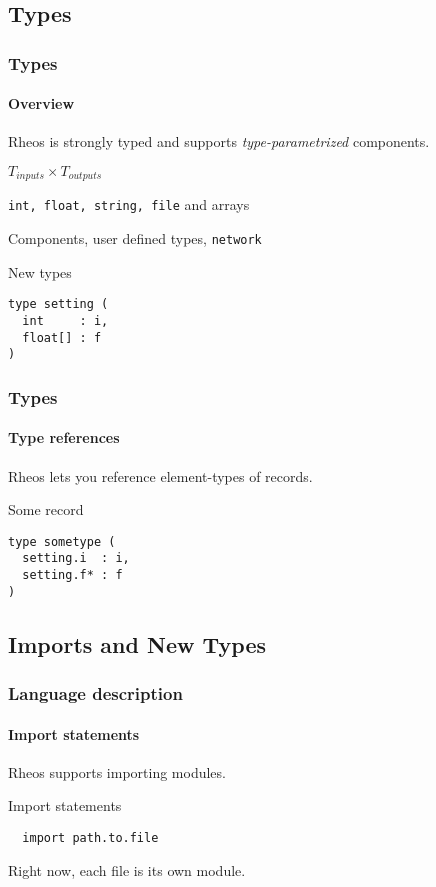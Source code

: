 \subsection*{Types}
\begin{frame}[fragile]
\frametitle{Types}
\framesubtitle{Overview}

Rheos is strongly typed and supports \emph{type-parametrized}
components.

\begin{description}
\pause
\item [Components:] $T_{inputs} \times T_{outputs}$
\pause
\item [Primitive types:] \verb|int, float, string, file| and arrays
\pause
\item [Record types:] Components, user defined types, \verb|network|
\end{description}

\pause
\begin{block}{New types}
\begin{verbatim}
type setting (
  int     : i,
  float[] : f
)
\end{verbatim}
\end{block}

\end{frame}


\begin{frame}[fragile]
\frametitle{Types}
\framesubtitle{Type references}

Rheos lets you reference element-types of records.

\pause
\begin{block}{Some record}
\begin{verbatim}
type sometype (
  setting.i  : i,
  setting.f* : f
)
\end{verbatim}
\end{block}

\end{frame}


\subsection*{Imports and New Types}
\begin{frame}[fragile]
\frametitle{Language description}
\framesubtitle{Import statements}

Rheos supports importing modules.

\pause
\begin{block}{Import statements}
\begin{verbatim}
  import path.to.file
\end{verbatim}
\end{block}

\pause
Right now, each file is its own module.

\end{frame}

